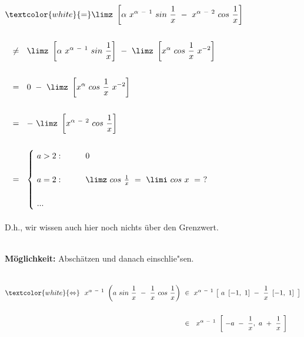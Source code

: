 \begin{description}[leftmargin=*, labelsep=3em, itemsep=3em]
	$\begin{aligned}
	&\textcolor{white}{=} \limz ~ \left[ \alpha ~ x^{\alpha ~ - ~ 1} ~ sin ~ \frac{1}{x} ~ - ~ x^{\alpha ~ - ~ 2}  ~ cos ~ \frac{1}{x} \right] \\ \\
	& ~~ \neq ~~ \limz ~ \left[ \alpha ~ x^{\alpha ~ - ~ 1} ~ sin ~ \frac{1}{x} \right] ~ - ~ \limz ~ \left[ x^{\alpha}  ~ cos ~ \frac{1}{x} ~  x^{-2} \right] \\ \\
	& ~~ = ~~ 0 ~ - ~ \limz ~ \left[ x^{\alpha}  ~ cos ~ \frac{1}{x} ~  x^{-2} \right] \\ \\
	& ~~ = ~~ - ~ \limz ~ \left[ x^{\alpha ~ - ~ 2}  ~ cos ~ \frac{1}{x} \right] \\ \\
	& ~~ = ~~ {\begin{cases}
		~ a > 2: \qquad & 0 \\ \\
		~ a = 2: \qquad & \limz ~ cos ~ \frac{1}{x} ~ = ~ \limi ~ cos ~ x ~ = ~ ? \\ \\
		~ ... 
	\end{cases}}
	\end{aligned}$\\
	
	~\\D.h., wir wissen auch hier noch nichts über den Grenzwert.

	~\\
	
	\textbf{Möglichkeit:} \qquad Abschätzen und danach einschlie{"s}en.
	
	~\\
	
	$\begin{aligned}
	\textcolor{white}{\Leftrightarrow} ~~ x^{\alpha ~ - ~ 1} ~ \left( a ~ sin ~ \frac{1}{x} ~ - ~ \frac{1}{x} ~ cos ~ \frac{1}{x} \right) ~ &\in ~ x^{\alpha ~ - ~ 1} ~ \big[ ~ a ~ \left[ -1, ~ 1 \right] ~ - ~ \frac{1}{x} ~ \left[ -1, ~ 1 \right] ~ \big] \\ \\
	&\in ~~ x^{\alpha ~ - ~ 1} ~ \left[ ~ -a ~ - ~ \frac{1}{x}, ~ a ~ + ~ \frac{1}{x} ~ \right]
	\end{aligned}$ \\
	
	~\\
	

\end{description}
